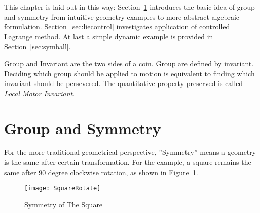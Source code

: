 This chapter is laid out in this way:
Section~\ref{sec:groupandsymmetry} introduces the basic idea of group and symmetry from intuitive geometry examples to more abstract algebraic formulation. Section~\ref{sec:liecontrol} investigates application of controlled Lagrange method.
At last a simple dynamic example is provided in Section~\ref{sec:symball}.

Group and Invariant are the two sides of a coin.
Group are defined by invariant.
Deciding which group should be applied to motion is equivalent to finding which invariant should be persevered.
The quantitative property preserved is called \emph{Local Motor Invariant}.







\section{Group and Symmetry}
\label{sec:groupandsymmetry}
%
%



For the more traditional geometrical perspective, ''Symmetry''  means a geometry is the same after certain transformation.
For the example, a square remains the same after  $90$ degree clockwise rotation, as shown in Figure~\ref{fig:symsquare}.
\begin{figure}[!htbp]
  	\begin{center}
   	\texttt{[image: SquareRotate]}
	\end{center}
	\caption{Symmetry of The Square}
    \label{fig:symsquare}
\end{figure}

